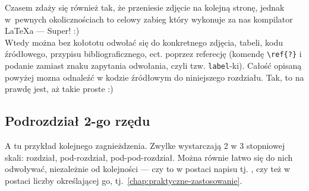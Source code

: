 Czasem zdaży się również tak, że przeniesie zdjęcie na kolejną stronę, jednak w~pewnych okolicznościach to celowy zabieg który wykonuje za nas kompilator LaTeXa --- Super! :) \\
Wtedy można bez kołototu odwołać się do konkretnego zdjęcia, tabeli, kodu źródłowego, przypisu bibliograficznego, ect. poprzez referecję (komendę \texttt{\textbackslash{}ref\{?\}} i podanie zamiast znaku zapytania odwołania, czyli tzw. \texttt{label}-ki). Całość opisaną powyżej mozna odnaleźć w kodzie źródłowym do niniejszego rozdziału. Tak, to na prawdę jest, aż takie proste :)

\subsection{Podrozdział 2-go rzędu}
\label{subsec:podrozdzial-2-rzedu}

A tu przykład kolejnego zagnieżdzenia. Zwylke wystarczają 2 w 3 stopniowej skali: rozdział, pod-rozdział, pod-pod-rozdział. Można równie łatwo się do nich odwoływać, niezależnie od kolejności --- czy to w postaci napisu tj. , czy też w postaci liczby określającej go, tj.~\ref{chap:praktyczne-zastosowanie}.

